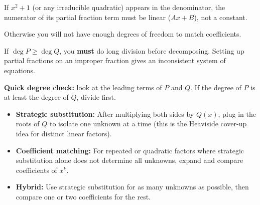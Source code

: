 \begin{commonmistake}[title={Common Mistake: Missing $(Ax+B)$ over an irreducible quadratic}]

If $x^2+1$ (or any irreducible quadratic) appears in the denominator, the numerator of its partial fraction term must be linear ($Ax+B$), not a constant.

Otherwise you will not have enough degrees of freedom to match coefficients.

\end{commonmistake}

\begin{commonmistake}[title={Common Mistake: Forgetting long division for improper fractions}]
If $\deg P \ge \deg Q$, you \textbf{must} do long division before decomposing. Setting up partial fractions on an improper fraction gives an inconsistent system of equations.

\textbf{Quick degree check:} look at the leading terms of $P$ and $Q$. If the degree of $P$ is at least the degree of $Q$, divide first.
\end{commonmistake}

\begin{examtip}[title={Exam Focus: Efficient coefficient-finding strategies}]
\begin{itemize}[leftmargin=*]
\item \textbf{Strategic substitution:} After multiplying both sides by $Q(x)$, plug in the roots of $Q$ to isolate one unknown at a time (this is the Heaviside cover-up idea for distinct linear factors).
\item \textbf{Coefficient matching:} For repeated or quadratic factors where strategic substitution alone does not determine all unknowns, expand and compare coefficients of $x^k$.
\item \textbf{Hybrid:} Use strategic substitution for as many unknowns as possible, then compare one or two coefficients for the rest.
\end{itemize}
\end{examtip}

